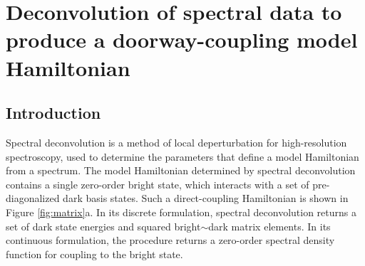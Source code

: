 % 








\chapter{Deconvolution of spectral data to produce a doorway-coupling
  model Hamiltonian}

\section{Introduction}

Spectral deconvolution is a method of local deperturbation for
high-resolution spectroscopy, used to determine the parameters that
define a model Hamiltonian from a spectrum.  The model Hamiltonian
determined by spectral deconvolution contains a single zero-order
bright state, which interacts with a set of pre-diagonalized dark
basis states.  Such a direct-coupling Hamiltonian is shown in Figure
\ref{fig:matrix}a.  In its discrete formulation, spectral
deconvolution returns a set of dark state energies and squared
bright$\sim$dark matrix elements.  In its continuous formulation, the
procedure returns a zero-order spectral density function for coupling
to the bright state.

